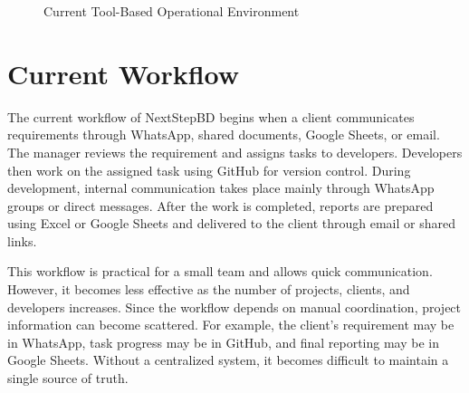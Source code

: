 \documentclass[12pt,a4paper]{report}
\begin{document}
\begin{figure}[H]
\centering
{}
\caption{Current Tool-Based Operational Environment}
\end{figure}

\section{Current Workflow}

The current workflow of NextStepBD begins when a client communicates requirements through WhatsApp, shared documents, Google Sheets, or email. The manager reviews the requirement and assigns tasks to developers. Developers then work on the assigned task using GitHub for version control. During development, internal communication takes place mainly through WhatsApp groups or direct messages. After the work is completed, reports are prepared using Excel or Google Sheets and delivered to the client through email or shared links.

This workflow is practical for a small team and allows quick communication. However, it becomes less effective as the number of projects, clients, and developers increases. Since the workflow depends on manual coordination, project information can become scattered. For example, the client’s requirement may be in WhatsApp, task progress may be in GitHub, and final reporting may be in Google Sheets. Without a centralized system, it becomes difficult to maintain a single source of truth.
\end{document}
